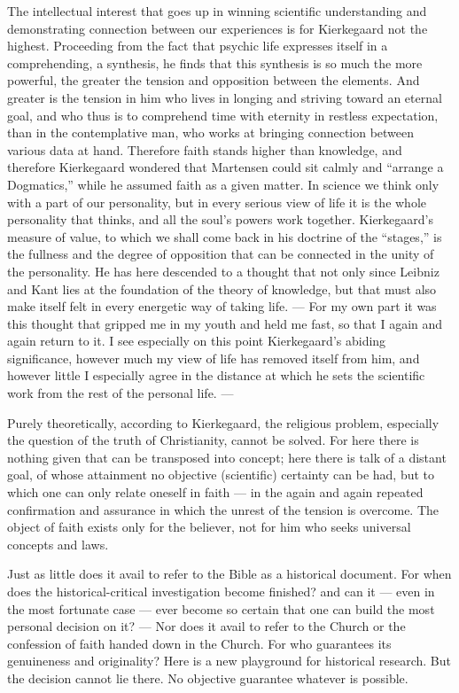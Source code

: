 \documentclass[12pt,a4paper]{book}
\newcommand{\opage}[1]{\marginnote{\footnotesize\textit{[#1]}}}
\begin{document}
The intellectual interest that goes up in winning scientific understanding and demonstrating
connection between our experiences is for Kierkegaard not the highest. Proceeding from the
fact that psychic life expresses itself in a comprehending, a synthesis, he finds that this
synthesis is so much the more powerful, the greater the tension and opposition between the
elements. And greater is the tension in him who lives in longing and \opage{154}striving toward an
eternal goal, and who thus is to comprehend time with eternity in restless expectation, than
in the contemplative man, who works at bringing connection between various data at hand.
Therefore faith stands higher than knowledge, and therefore Kierkegaard wondered that
Martensen could sit calmly and ``arrange a Dogmatics,'' while he assumed faith as a given
matter. In science we think only with a part of our personality, but in every serious view
of life it is the whole personality that thinks, and all the soul's powers work together.
Kierkegaard's measure of value, to which we shall come back in his doctrine of the
``stages,'' is the fullness and the degree of opposition that can be connected in the unity
of the personality. He has here descended to a thought that not only since Leibniz and Kant
lies at the foundation of the theory of knowledge, but that must also make itself felt in
every energetic way of taking life. --- For my own part it was this thought that gripped me
in my youth and held me fast, so that I again and again return to it. I see especially on
this point Kierkegaard's abiding significance, however much my view of life has removed
itself from him, and however little I especially agree in the distance at which he sets the
scientific work from the rest of the personal life. ---

Purely theoretically, according to Kierkegaard, the religious problem, especially the
question of the truth of Christianity, cannot be solved. For here there is nothing given
that can be transposed into concept; here there is talk of a distant goal, of whose
attainment no objective (scientific) certainty can be had, but to which one can only relate
oneself in faith --- in the again and again repeated confirmation and assurance in which the
unrest of the tension is overcome. The object of faith exists only for the believer, not for
him who seeks universal concepts and laws.

Just as little does it avail to refer to the Bible as a historical document. For when does
the historical-critical investigation become finished? and can it --- even in the most
fortunate case --- ever become so certain that one can build the most personal decision on
it? --- Nor does it avail to refer to the Church \opage{155}or the confession of faith handed down in
the Church. For who guarantees its genuineness and originality? Here is a new playground for
historical research. But the decision cannot lie there. No objective guarantee whatever is
possible.
\end{document}
